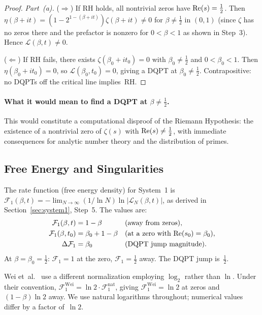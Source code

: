 \begin{proof}
\emph{Part~(a).}
($\Rightarrow$) If RH holds, all nontrivial zeros have $\operatorname{Re}(s) = \tfrac{1}{2}$. Then
$\eta(\beta+it) = (1-2^{1-(\beta+it)})\zeta(\beta+it) \ne 0$ for $\beta \ne \tfrac{1}{2}$
in $(0,1)$ (since $\zeta$ has no zeros there and the prefactor is nonzero for
$0 < \beta < 1$ as shown in Step~3). Hence $\mathcal{L}(\beta,t) \ne 0$.

($\Leftarrow$) If RH fails, there exists $\zeta(\beta_0+it_0) = 0$ with
$\beta_0 \ne \tfrac{1}{2}$ and $0 < \beta_0 < 1$. Then $\eta(\beta_0+it_0) = 0$, so
$\mathcal{L}(\beta_0,t_0) = 0$, giving a DQPT at $\beta_0 \ne \tfrac{1}{2}$.
Contrapositive: no DQPTs off the critical line implies~RH.
\end{proof}

\paragraph{What it would mean to find a DQPT at $\beta \ne \tfrac{1}{2}$.}
This would constitute a computational disproof of the Riemann Hypothesis: the existence
of a nontrivial zero of $\zeta(s)$ with $\operatorname{Re}(s) \ne \tfrac{1}{2}$, with immediate
consequences for analytic number theory and the distribution of primes.


\subsection{Free Energy and Singularities}
\label{sec:free-energy}

The rate function (free energy density) for System~1 is
$\mathcal{F}_1(\beta,t) = -\lim_{N\to\infty}(1/\ln N)\ln|\mathcal{L}_N(\beta,t)|$,
as derived in Section~\ref{sec:system1}, Step~5. The values are:
\begin{align}
  \mathcal{F}_1(\beta,t) &= 1-\beta && \text{(away from zeros)}, \\
  \mathcal{F}_1(\beta,t_0) &= \beta_0+1-\beta && \text{(at a zero with $\operatorname{Re}(s_0)=\beta_0$)}, \\
  \Delta\mathcal{F}_1 &= \beta_0 && \text{(DQPT jump magnitude)}.
\end{align}
At $\beta = \beta_0 = \tfrac{1}{2}$: $\mathcal{F}_1 = 1$ at the zero,
$\mathcal{F}_1 = \tfrac{1}{2}$ away. The DQPT jump is~$\tfrac{1}{2}$.

\begin{remark}\label{rem:norm}
Wei et~al.~\cite{wei2025} use a different normalization employing $\log_2$ rather than
$\ln$. Under their convention, $\mathcal{F}_1^{\mathrm{Wei}} = \ln 2 \cdot
\mathcal{F}_1^{\mathrm{nat}}$, giving $\mathcal{F}_1^{\mathrm{Wei}} = \ln 2$ at zeros
and $(1-\beta)\ln 2$ away. We use natural logarithms throughout; numerical values differ
by a factor of~$\ln 2$.
\end{remark}
